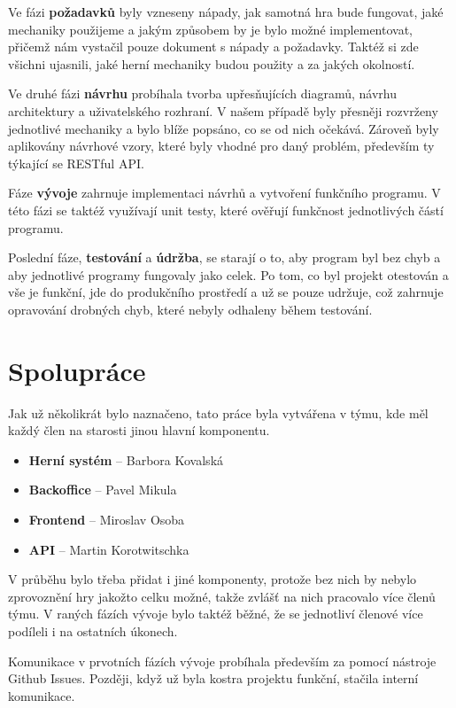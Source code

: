 Ve fázi \textbf{požadavků} byly vzneseny nápady, jak samotná hra bude fungovat, jaké mechaniky použijeme a jakým způsobem by je bylo možné implementovat, přičemž nám vystačil pouze dokument s nápady a požadavky. Taktéž si zde všichni ujasnili, jaké herní mechaniky budou použity a za jakých okolností. 

Ve druhé fázi \textbf{návrhu} probíhala tvorba upřesňujících diagramů, návrhu architektury a uživatelského rozhraní. V našem případě byly přesněji rozvrženy jednotlivé mechaniky a bylo blíže popsáno, co se od nich očekává. Zároveň byly aplikovány návrhové vzory, které byly vhodné pro daný problém, především ty týkající se RESTful API.

Fáze \textbf{vývoje} zahrnuje implementaci návrhů a vytvoření funkčního programu. V této fázi se taktéž využívají unit testy, které ověřují funkčnost jednotlivých částí programu. 

Poslední fáze, \textbf{testování} a \textbf{údržba}, se starají o to, aby program byl bez chyb a aby jednotlivé programy fungovaly jako celek. Po tom, co byl projekt otestován a vše je funkční, jde do produkčního prostředí a už se pouze udržuje, což zahrnuje opravování drobných chyb, které nebyly odhaleny během testování.

\section{Spolupráce}\label{sec:collaboration}
Jak už několikrát bylo naznačeno, tato práce byla vytvářena v týmu, kde měl každý člen na starosti jinou hlavní komponentu.
\begin{itemize}[itemsep=0pt,parsep=0pt]
    \item \textbf{Herní systém} -- Barbora Kovalská
    \item \textbf{Backoffice} -- Pavel Mikula
    \item \textbf{Frontend} -- Miroslav Osoba
    \item \textbf{API} -- Martin Korotwitschka
\end{itemize}

V průběhu bylo třeba přidat i jiné komponenty, protože bez nich by nebylo zprovoznění hry jakožto celku možné, takže zvlášť na nich pracovalo více členů týmu. V raných fázích vývoje bylo taktéž běžné, že se jednotliví členové více podíleli i na ostatních úkonech. 

Komunikace v prvotních fázích vývoje probíhala především za pomocí nástroje Github Issues. Později, když už byla kostra projektu funkční, stačila interní komunikace.

